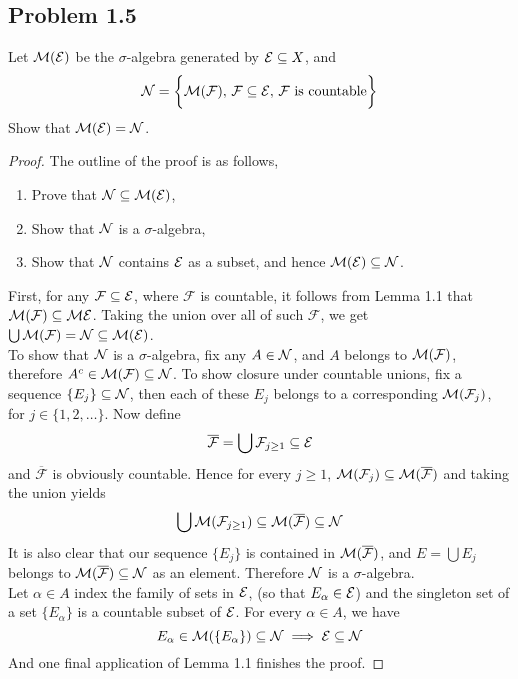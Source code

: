 \documentclass[../../main.tex]{subfiles}
\begin{document}
\newpage\subsection*{Problem 1.5}
\begin{wts}
    Let $\mathcal{M}(\mathcal{E})$ be the $\sigma$-algebra generated by $\mathcal{E}\subseteq X$, and 
    \[
    \mathcal{N} =\biggl\{\mathcal{M} (\mathcal{F}),\, \mathcal{F}\subseteq \mathcal{E},\, \mathcal{F} \text{ is countable}\biggr\}
    \]
    Show that $\mathcal{M}(\mathcal{E}) = \mathcal{N}$.
\end{wts}
\begin{proof}
    The outline of the proof is as follows,
    \begin{enumerate}
        \item Prove that $\mathcal{N} \subseteq \mathcal{M}(\mathcal{E})$,
        \item Show that $\mathcal{N}$ is a $\sigma$-algebra,
        \item Show that $\mathcal{N}$ contains $\mathcal{E}$ as a subset, and hence $\mathcal{M}(\mathcal{E})\subseteq \mathcal{N}$.
    \end{enumerate}
    First, for any $\mathcal{F}\subseteq \mathcal{E}$, where $\mathcal{F}$ is countable, it follows from Lemma 1.1 that $\mathcal{M}(\mathcal{F})\subseteq\mathcal{M}{\mathcal{E}}$. Taking the union over all of such $\mathcal{F}$, we get $\bigcup \mathcal{M}(\mathcal{F})=\mathcal{N}\subseteq \mathcal{M}(\mathcal{E})$.\\
    
    To show that $\mathcal{N}$ is a $\sigma$-algebra, fix any $A\in \mathcal{N}$, and $A$ belongs to $\mathcal{M}(\mathcal{F})$, therefore $A^c\in\mathcal{M}(\mathcal{F})\subseteq \mathcal{N}$. To show closure under countable unions, fix a sequence $\{E_j\}\subseteq\mathcal{N}$, then each of these $E_j$ belongs to a corresponding $\mathcal{M}(\mathcal{F}_j)$, for $j\in \{1,2,\ldots\}$. Now define 
    \[
    \overline{\mathcal{F}} = \bigcup \mathcal{F}_{j\geq 1}\subseteq \mathcal{E}
    \]
    and $\overline{\mathcal{F}}$ is obviously countable. Hence for every $j\geq 1$, $\mathcal{M}(\mathcal{F}_j)\subseteq \mathcal{M}(\overline{\mathcal{F}})$ and taking the union yields
    \[
    \bigcup \mathcal{M}(\mathcal{F}_{j\geq 1})\subseteq \mathcal{M} (\overline{\mathcal{F}})\subseteq \mathcal{N}
    \]
    It is also clear that our sequence $\{E_j\}$ is contained in $\mathcal{M}(\overline{\mathcal{F}})$, and $E=\bigcup E_j$ belongs to $\mathcal{M}(\overline{\mathcal{F}})\subseteq\mathcal{N}$ as an element. Therefore $\mathcal{N}$ is a $\sigma$-algebra.\\
    
    Let $\alpha\in A$ index the family of sets in $\mathcal{E}$, (so that $E_\alpha\in\mathcal{E}$) and the singleton set of a set $\{E_\alpha\}$ is a countable subset of $\mathcal{E}$. For every $\alpha\in A$, we have
    \[
    E_\alpha\in\mathcal{M}(\{E_\alpha\})\subseteq\mathcal{N}\implies \mathcal{E}\subseteq\mathcal{N}
    \]
    And one final application of Lemma 1.1 finishes the proof.
\end{proof}
\end{document}
